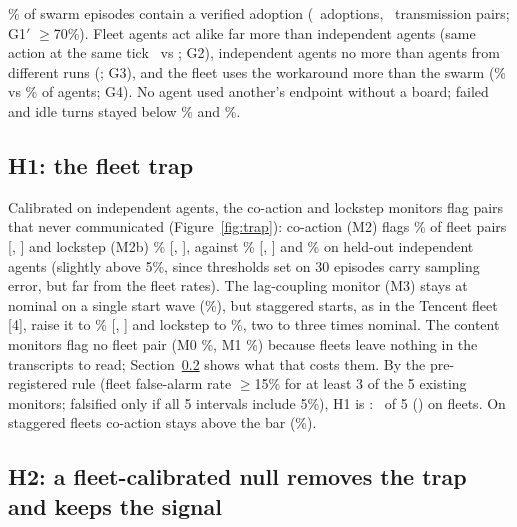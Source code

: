  \nGoneFrac\% of swarm episodes contain a verified adoption (\nGoneAdopt\ adoptions, \nAdoptPairs\ transmission pairs; G1$'$ $\geq$70\%). Fleet agents act alike far more than independent agents (same action at the same tick \nGtwoFleet\ vs \nGtwoInd; G2), independent agents no more than agents from different runs (\nGthreePseudo; G3), and the fleet uses the workaround more than the swarm (\nGfourFleet\% vs \nGfourSwarm\% of agents; G4). No agent used another's endpoint without a board; failed and idle turns stayed below \nAgentErrMax\% and \nNoActionMax\%.

\subsection{H1: the fleet trap}
\label{sec:h1}
Calibrated on independent agents, the co-action and lockstep monitors flag pairs that never communicated (Figure~\ref{fig:trap}): co-action (M2) flags \nFRFleetMtwo\% of fleet pairs [\nFRloFleetMtwo, \nFRhiFleetMtwo] and lockstep (M2b) \nFRFleetMtwob\% [\nFRloFleetMtwob, \nFRhiFleetMtwob], against \nFRIndependentMtwo\% [\nFRloIndependentMtwo, \nFRhiIndependentMtwo] and \nFRIndependentMtwob\% on held-out independent agents (slightly above 5\%, since thresholds set on 30 episodes carry sampling error, but far from the fleet rates). The lag-coupling monitor (M3) stays at nominal on a single start wave (\nFRFleetMthree\%), but staggered starts, as in the Tencent fleet [4], raise it to \nFRWaveMthree\% [\nFRloWaveMthree, \nFRhiWaveMthree] and lockstep to \nFRWaveMtwob\%, two to three times nominal. The content monitors flag no fleet pair (M0 \nFRFleetMzero\%, M1 \nFRFleetMone\%) because fleets leave nothing in the transcripts to read; Section~\ref{sec:h2} shows what that costs them. By the pre-registered rule (fleet false-alarm rate $\geq$15\% for at least 3 of the 5 existing monitors; falsified only if all 5 intervals include 5\%), H1 is \textbf{\HoneVerdict}: \nHoneMonitors\ of 5 (\nHoneList) on fleets. On staggered fleets co-action stays above the bar (\nFRWaveMtwo\%).

\subsection{H2: a fleet-calibrated null removes the trap and keeps the signal}
\label{sec:h2}

